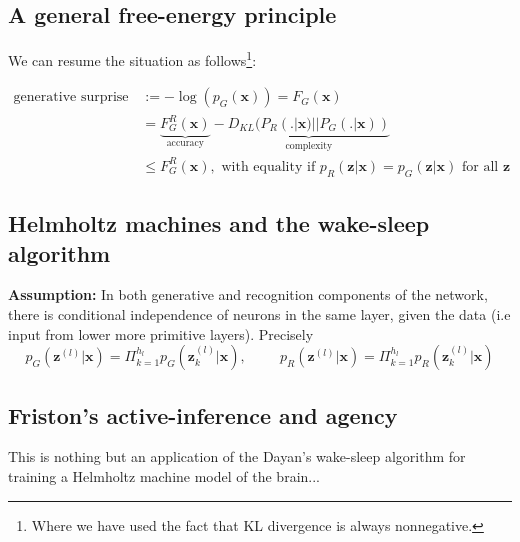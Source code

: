 \documentclass[10pt,letterpaper]{article}
\newtheorem{theorem}{Theorem} \newtheorem{lemma}[theorem]{Lemma}
\def\z{\mathbf{z}}
\def\x{\mathbf{x}}
\begin{document}
\subsection{A general free-energy principle}
We can resume the situation as follows\footnote{Where we have used the fact that KL divergence is always nonnegative.}:
\begin{mdframed}
\begin{equation}
  \begin{split}
    \text{generative surprise } &:= -\log(p_G(\x)) = F_G(\x) \\
    &=\underbrace{F^R_G(\x)}_{\text{accuracy}} - \underbrace{D_{KL}(P_R(.|\x) || P_G(.|\x))}_{\text{complexity}} \\
    &\le F^R_G(\x),
    \text{ with equality if }p_R(\z|\x) = p_G(\z|\x)\text{ for all } \z
    \end{split}
\end{equation}
\end{mdframed}

\subsection{Helmholtz machines and the wake-sleep algorithm}
  \textbf{Assumption:} In both generative and recognition components of the network, there is conditional independence of  neurons in the same layer, given the data (i.e input from lower more primitive layers). Precisely
$$
p_G(\z^{(l)}|\x) = \Pi_{k=1}^{h_l}p_G(\z_k^{(l)} | \x),\hspace{1cm}
p_R(\z^{(l)}|\x) = \Pi_{k=1}^{h_l}p_R(\z_k^{(l)} |\x)
$$

\subsection{Friston's active-inference and agency}
\label{sec:friston}
This is nothing but an application of the Dayan's wake-sleep algorithm for training a Helmholtz machine model of the brain...
\end{document}
